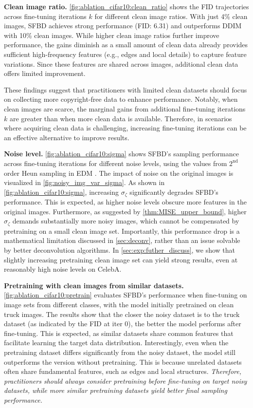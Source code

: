 \textbf{Clean image ratio.} \cref{fig:ablation_cifar10:clean_ratio} shows the FID trajectories across fine-tuning iterations $k$ for different clean image ratios. With just 4\% clean images, SFBD achieves strong performance (FID: 6.31) and outperforms DDIM with 10\% clean images. While higher clean image ratios further improve performance, the gains diminish as a small amount of clean data already provides sufficient high-frequency features (e.g., edges and local details) to capture feature variations. Since these features are shared across images, additional clean data offers limited improvement.


These findings suggest that practitioners with limited clean datasets should focus on collecting more copyright-free data to enhance performance. Notably, when clean images are scarce, the marginal gains from additional fine-tuning iterations $k$ are greater than when more clean data is available. Therefore, in scenarios where acquiring clean data is challenging, increasing fine-tuning iterations can be an effective alternative to improve results.
\vspace{-0.3em}

\textbf{Noise level.} \cref{fig:ablation_cifar10:sigma} shows SFBD's sampling performance across fine-tuning iterations for different noise levels, using the values from $2^\text{nd}$ order Heun sampling in EDM \citep{KarrasAAL22}. The impact of noise on the original images is visualized in \cref{fig:noisy_img_var_sigma}. As shown in \cref{fig:ablation_cifar10:sigma}, increasing $\sigma_\zeta$ significantly degrades SFBD's performance. This is expected, as higher noise levels obscure more features in the original images. Furthermore, as suggested by \cref{thm:MISE_upper_bound}, higher $\sigma_\zeta$ demands substantially more noisy images, which cannot be compensated by pretraining on a small clean image set. Importantly, this performance drop is a mathematical limitation discussed in \cref{sec:deconv}, rather than an issue solvable by better deconvolution algorithms. In \cref{sec:exp:futher_discuss}, we show that slightly increasing pretraining clean image set can yield strong results, even at reasonably high noise levels on CelebA.

\textbf{Pretraining with clean images from similar datasets.} \cref{fig:ablation_cifar10:pretrain} evaluates SFBD's performance when fine-tuning on image sets from different classes, with the model initially pretrained on clean truck images. The results show that the closer the noisy dataset is to the truck dataset (as indicated by the FID at iter 0), the better the model performs after fine-tuning. This is expected, as similar datasets share common features that facilitate learning the target data distribution.
Interestingly, even when the pretraining dataset differs significantly from the noisy dataset, the model still outperforms the version without pretraining. This is because unrelated datasets often share fundamental features, such as edges and local structures.  \textit{Therefore, practitioners should always consider pretraining before fine-tuning on target noisy datasets, while more similar pretraining datasets yield better final sampling performance.}





